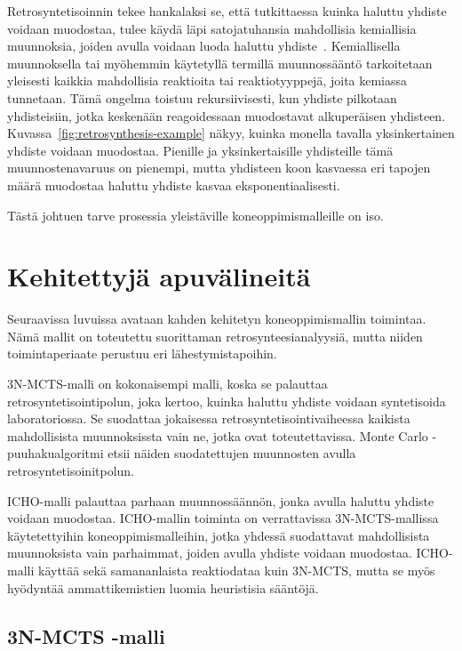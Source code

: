 \documentclass[finnish,twoside,censored,tkt,sw-line]{HYthesisML}
\begin{document}
Retrosyntetisoinnin tekee hankalaksi se, että tutkittaessa kuinka haluttu yhdiste voidaan muodostaa, tulee käydä läpi satojatuhansia mahdollisia kemiallisia muunnoksia, joiden avulla voidaan luoda haluttu yhdiste~\cite{SeglerMarwinHS2018Pcsw}.
Kemiallisella muunnoksella tai myöhemmin käytetyllä termillä muunnossääntö tarkoitetaan yleisesti kaikkia mahdollisia reaktioita tai reaktiotyyppejä, joita kemiassa tunnetaan.
Tämä ongelma toistuu rekursiivisesti, kun yhdiste pilkotaan yhdisteisiin, jotka keskenään reagoidessaan muodostavat alkuperäisen yhdisteen.
Kuvassa~\ref{fig:retrosynthesis-example} näkyy, kuinka monella tavalla yksinkertainen yhdiste voidaan muodostaa.
Pienille ja yksinkertaisille yhdisteille tämä muunnostenavaruus on pienempi, mutta yhdisteen koon kasvaessa eri tapojen määrä muodostaa haluttu yhdiste kasvaa eksponentiaalisesti.

Tästä johtuen tarve prosessia yleistäville koneoppimismalleille on iso.

\section{Kehitettyjä apuvälineitä}

Seuraavissa luvuissa avataan kahden kehitetyn koneoppimismallin toimintaa.
Nämä mallit on toteutettu suorittaman retrosynteesianalyysiä, mutta niiden toimintaperiaate perustuu eri lähestymistapoihin.

3N-MCTS-malli on kokonaisempi malli, koska se palauttaa retrosyntetisointipolun, joka kertoo, kuinka haluttu yhdiste voidaan syntetisoida laboratoriossa.
Se suodattaa jokaisessa retrosyntetisointivaiheessa kaikista mahdollisista muunnoksissta vain ne, jotka ovat toteutettavissa.
Monte Carlo -puuhakualgoritmi etsii näiden suodatettujen muunnosten avulla retrosyntetisoinitpolun.

ICHO-malli palauttaa parhaan muunnossäännön, jonka avulla haluttu yhdiste voidaan muodostaa.
ICHO-mallin toiminta on verrattavissa 3N-MCTS-mallissa käytetettyihin koneoppimismalleihin, jotka yhdessä suodattavat mahdollisista muunnoksista vain parhaimmat, joiden avulla yhdiste voidaan muodostaa.
ICHO-malli käyttää sekä samananlaista reaktiodataa kuin 3N-MCTS, mutta se myös hyödyntää ammattikemistien luomia heuristisia sääntöjä.

\subsection{3N-MCTS -malli}
\end{document}
